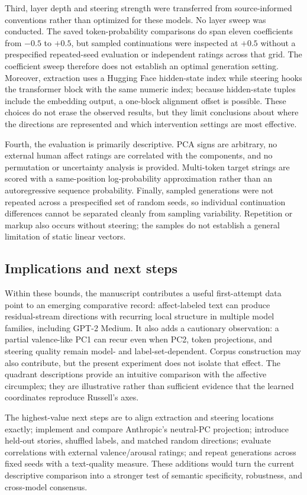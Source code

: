 Third, layer depth and steering strength were transferred from source-informed conventions rather than optimized for these models. 
No layer sweep was conducted. The saved token-probability comparisons do span eleven coefficients from $-0.5$ to $+0.5$, but
sampled continuations were inspected at $+0.5$ without a prespecified repeated-seed evaluation or independent ratings across that
grid. The coefficient sweep therefore does not establish an optimal generation setting. Moreover, extraction uses a Hugging Face
hidden-state index while
steering hooks the transformer block with the same numeric index; because hidden-state tuples include the embedding output, 
a one-block alignment offset is possible. These choices do not erase the observed results, but they limit conclusions about 
where the directions are represented and which intervention settings are most effective.

Fourth, the evaluation is primarily descriptive. PCA signs are arbitrary, no external human affect ratings are correlated with 
the components, and no permutation or uncertainty analysis is provided. Multi-token target strings are scored with a same-position 
log-probability approximation rather than an autoregressive sequence probability. Finally, sampled generations were not repeated 
across a prespecified set of random seeds, so individual continuation differences cannot be separated cleanly from sampling
variability. Repetition or markup also occurs without steering; the samples do not establish a general limitation of static linear
vectors.

\subsection{Implications and next steps}

Within these bounds, the manuscript contributes a useful first-attempt data point to an emerging comparative record: affect-labeled text 
can produce residual-stream directions with recurring local structure in multiple model families, including GPT-2 Medium. It also adds 
a cautionary observation: a partial valence-like PC1 can recur even when PC2, token projections, and steering quality remain 
model- and label-set-dependent. Corpus construction may also contribute, but the present experiment does not isolate that effect. 
The quadrant descriptions provide an intuitive comparison with the affective circumplex; they are illustrative rather than sufficient 
evidence that the learned coordinates reproduce Russell's axes.

The highest-value next steps are to align extraction and steering locations exactly; implement and compare Anthropic's neutral-PC 
projection; introduce held-out stories, shuffled labels, and matched random directions; evaluate correlations with external 
valence/arousal ratings; and repeat generations across fixed seeds with a text-quality measure. These additions would turn the 
current descriptive comparison into a stronger test of semantic specificity, robustness, and cross-model consensus.
